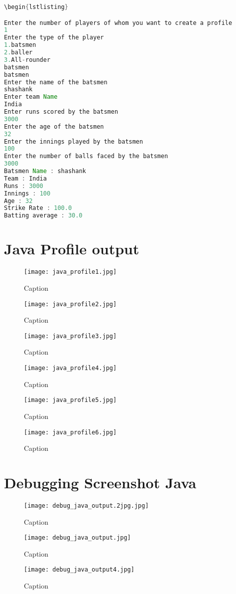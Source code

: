 \documentclass{article}
\begin{document}
\begin{lstlisting}[style=chstyle,language=Java]
\begin{lstlisting}

Enter the number of players of whom you want to create a profile
1
Enter the type of the player
1.batsmen
2.baller
3.All-rounder
batsmen
batsmen
Enter the name of the batsmen
shashank
Enter team Name
India
Enter runs scored by the batsmen
3000
Enter the age of the batsmen
32
Enter the innings played by the batsmen
100 
Enter the number of balls faced by the batsmen
3000
Batsmen Name : shashank
Team : India
Runs : 3000
Innings : 100
Age : 32
Strike Rate : 100.0
Batting average : 30.0
\end{lstlisting}
\section{Java Profile output}
\newpage

\begin{figure}
    \centering
    \texttt{[image: java\_profile1.jpg]}
    \caption{Caption}
    \label{fig:my_label}
\end{figure}
\begin{figure}
    \centering
    \texttt{[image: java\_profile2.jpg]}
    \caption{Caption}
    \label{fig:my_label}
\end{figure}
\begin{figure}
    \centering
    \texttt{[image: java\_profile3.jpg]}
    \caption{Caption}
    \label{fig:my_label}
\end{figure}
\begin{figure}
    \centering
    \texttt{[image: java\_profile4.jpg]}
    \caption{Caption}
    \label{fig:my_label}
\end{figure}
\begin{figure}
    \centering
    \texttt{[image: java\_profile5.jpg]}
    \caption{Caption}
    \label{fig:my_label}
\end{figure}
\begin{figure}
    \centering
    \texttt{[image: java\_profile6.jpg]}
    \caption{Caption}
    \label{fig:my_label}
\end{figure}

\newpage


\section{Debugging Screenshot Java}
\begin{figure}
    \centering
    \texttt{[image: debug\_java\_output.2jpg.jpg]}
    \caption{Caption}
    \label{fig:my_label}
\end{figure}
\begin{figure}
    \centering
    \texttt{[image: debug\_java\_output.jpg]}
    \caption{Caption}
    \label{fig:my_label}
\end{figure}
\begin{figure}
    \centering
    \texttt{[image: debug\_java\_output4.jpg]}
    \caption{Caption}
    \label{fig:my_label}
\end{figure}
\end{document}
